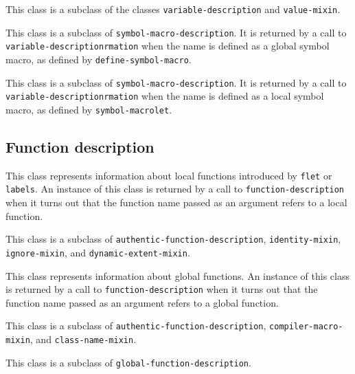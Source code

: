 This class is a subclass of the classes \texttt{variable-description} and
\texttt{value-mixin}.

{\footnotesize
{}
}

This class is a subclass of \texttt{symbol-macro-description}.  It is
returned by a call to \texttt{variable-descriptionrmation} when the name is
defined as a global symbol macro, as defined by
\texttt{define-symbol-macro}.

{\footnotesize
{}
}

This class is a subclass of \texttt{symbol-macro-description}.  It is
returned by a call to \texttt{variable-descriptionrmation} when the
name is defined as a local symbol macro, as defined by
\texttt{symbol-macrolet}.

\subsection{Function description}
\label{sec-instantiable-classes-function-desciption}

{\footnotesize
{}
}

This class represents information about local functions introduced by
\texttt{flet} or \texttt{labels}.  An instance of this class is
returned by a call to \texttt{function-description} when it turns out that
the function name passed as an argument refers to a local function.

This class is a subclass of \texttt{authentic-function-description},
\texttt{identity-mixin}, \texttt{ignore-mixin}, and \texttt{dynamic-extent-mixin}.

{\footnotesize
{}
}

This class represents information about global functions.  An instance
of this class is returned by a call to \texttt{function-description} when it
turns out that the function name passed as an argument refers to a
global function.

This class is a subclass of \texttt{authentic-function-description},
\texttt{compiler-macro-mixin}, and \texttt{class-name-mixin}.

{\footnotesize
{}
}

This class is a subclass of \texttt{global-function-description}.

{\footnotesize
{}
}


